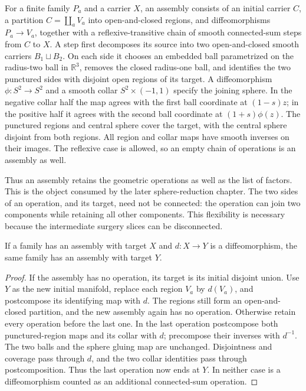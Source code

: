 \begin{definition}
\label{def:finite-smooth-assembly}
For a finite family $P_a$ and a carrier $X$, an assembly consists of an initial
carrier $C$, a partition $C=\coprod_a V_a$ into open-and-closed regions,
and diffeomorphisms $P_a\to V_a$, together with a reflexive-transitive chain
of smooth connected-sum steps from $C$ to $X$.  A step first decomposes its
source into two open-and-closed smooth carriers $B_1\sqcup B_2$.  On each side
it chooses an embedded ball parametrized on the radius-two ball in
$\mathbb R^3$, removes the closed radius-one ball, and identifies the two
punctured sides with disjoint open regions of its target.  A diffeomorphism
$\phi:S^2\to S^2$ and a smooth collar $S^2\times(-1,1)$ specify the joining
sphere.  In the negative collar half the map agrees with the first ball
coordinate at $(1-s)z$; in the positive half it agrees with the second ball
coordinate at $(1+s)\phi(z)$.  The punctured regions and central sphere cover
the target, with the central sphere disjoint from both regions.  All region
and collar maps have smooth inverses on their images.  The reflexive case is allowed, so an empty chain
of operations is an assembly as well.
\end{definition}

Thus an assembly retains the geometric operations as well as the list of
factors.  This is the object consumed by the later sphere-reduction chapter.
The two sides of an operation, and its target, need not be connected: the
operation can join two components while retaining all other components.
This flexibility is necessary because the intermediate surgery slices can
be disconnected.

\begin{lemma}
\label{lem:finite-assembly-transport}
If a family has an assembly with target $X$ and $d:X\to Y$ is a
diffeomorphism, the same family has an assembly with target $Y$.
\end{lemma}

\begin{proof}
If the assembly has no operation, its target is its initial disjoint union.
Use $Y$ as the new initial manifold, replace each region $V_a$ by $d(V_a)$,
and postcompose its identifying map with $d$.  The regions still form an
open-and-closed partition, and the new assembly again has no operation.
Otherwise retain every operation before the last one.  In the last
operation postcompose both punctured-region maps and its collar with $d$;
precompose their inverses with $d^{-1}$.  The two balls and the sphere
gluing map are unchanged.  Disjointness and coverage pass through $d$, and
the two collar identities pass through postcomposition.  Thus the last
operation now ends at $Y$.  In neither case is a diffeomorphism counted as
an additional connected-sum operation.
\end{proof}

